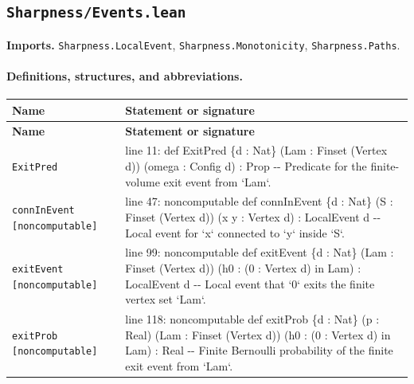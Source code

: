 \documentclass[10pt]{article}
\newcommand{\module}[1]{\texttt{#1}}
\begin{document}
\subsection*{\module{Sharpness/Events.lean}}
\textbf{Imports.} \module{Sharpness.LocalEvent}, \module{Sharpness.Monotonicity}, \module{Sharpness.Paths}.
\paragraph{Definitions, structures, and abbreviations.}
\begin{longtable}{>{\raggedright\arraybackslash}p{} >{\raggedright\arraybackslash}p{}}
\textbf{Name} & \textbf{Statement or signature} \\
\hline
\endfirsthead
\textbf{Name} & \textbf{Statement or signature} \\
\hline
\endhead
\texttt{ExitPred} & {\ttfamily\scriptsize line 11:\allowbreak{} def ExitPred \{d :\allowbreak{} Nat\} (\allowbreak{}Lam :\allowbreak{} Finset (\allowbreak{}Vertex d)\allowbreak{})\allowbreak{} (\allowbreak{}omega :\allowbreak{} Config d)\allowbreak{} :\allowbreak{} Prop -\allowbreak{}-\allowbreak{} Predicate for the finite-\allowbreak{}volume exit event from `Lam`.\allowbreak{}} \\[0.45em]
\texttt{connInEvent [noncomputable]} & {\ttfamily\scriptsize line 47:\allowbreak{} noncomputable def connInEvent \{d :\allowbreak{} Nat\} (\allowbreak{}S :\allowbreak{} Finset (\allowbreak{}Vertex d)\allowbreak{})\allowbreak{} (\allowbreak{}x y :\allowbreak{} Vertex d)\allowbreak{} :\allowbreak{} LocalEvent d -\allowbreak{}-\allowbreak{} Local event for `x` connected to `y` inside `S`.\allowbreak{}} \\[0.45em]
\texttt{exitEvent [noncomputable]} & {\ttfamily\scriptsize line 99:\allowbreak{} noncomputable def exitEvent \{d :\allowbreak{} Nat\} (\allowbreak{}Lam :\allowbreak{} Finset (\allowbreak{}Vertex d)\allowbreak{})\allowbreak{} (\allowbreak{}h0 :\allowbreak{} (\allowbreak{}0 :\allowbreak{} Vertex d)\allowbreak{} in Lam)\allowbreak{} :\allowbreak{} LocalEvent d -\allowbreak{}-\allowbreak{} Local event that `0` exits the finite vertex set `Lam`.\allowbreak{}} \\[0.45em]
\texttt{exitProb [noncomputable]} & {\ttfamily\scriptsize line 118:\allowbreak{} noncomputable def exitProb \{d :\allowbreak{} Nat\} (\allowbreak{}p :\allowbreak{} Real)\allowbreak{} (\allowbreak{}Lam :\allowbreak{} Finset (\allowbreak{}Vertex d)\allowbreak{})\allowbreak{} (\allowbreak{}h0 :\allowbreak{} (\allowbreak{}0 :\allowbreak{} Vertex d)\allowbreak{} in Lam)\allowbreak{} :\allowbreak{} Real -\allowbreak{}-\allowbreak{} Finite Bernoulli probability of the finite exit event from `Lam`.\allowbreak{}} \\[0.45em]

\end{longtable}
\end{document}
